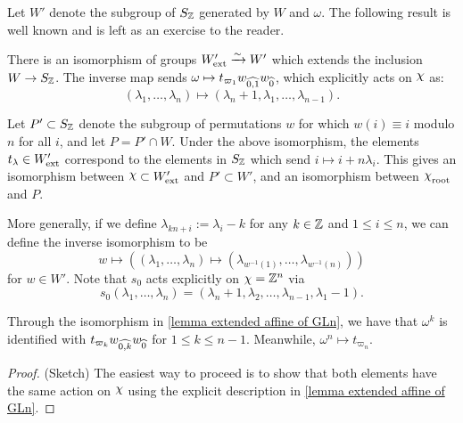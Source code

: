 Let $W'$ denote the subgroup of $S_{\mathbb{Z}}$ generated by $W$ and $\omega$. The following result is well known and is left as an exercise to the reader.

\begin{lemma}\label{lemma extended affine of GLn}
There is an isomorphism of groups $W'_{\operatorname{ext}} \xrightarrow{\sim} W'$
which extends the inclusion $W \to S_{\mathbb{Z}}$. The inverse map sends $\omega \mapsto t_{\varpi_1}w_{\widehat{0,1}}w_{\widehat{0}}$, which explicitly acts on $\rchi$ as:
$$(\lambda_1, \ldots,\lambda_n)\mapsto (\lambda_n +1, \lambda_1, \ldots, \lambda_{n-1}).$$

Let $P' \subset S_{\mathbb{Z}}$ denote the subgroup of permutations $w$ for which $w(i) \equiv i$ modulo $n$ for all $i$, and let $P = P' \cap W$. Under the above isomorphism, the elements $t_\lambda \in W_{\operatorname{ext}}'$ correspond to the elements in $S_{\mathbb{Z}}$ which send $i \mapsto i + n\lambda_i$. This gives an isomorphism between $\rchi \subset W_{\ext}'$ and $P' \subset W'$, and an isomorphism between $\rchi_{\rt}$ and $P$.
\end{lemma}

\begin{remark} More generally, if we define $\lambda_{kn+i}:=\lambda_i-k$ for any $k \in \mathbb{Z}$ and $1\leq i \leq n$, we can define the inverse isomorphism to be 
$$w \mapsto \left((\lambda_1,\ldots,\lambda_n) \mapsto(\lambda_{w^{-1}(1)}, \ldots, \lambda_{w^{-1}(n)})\right)$$
for $w \in W'$. Note that $s_0$ acts explicitly on $\chi=\mathbb{Z}^n$ via
$$s_0(\lambda_1, \ldots, \lambda_n)=(\lambda_n +1, \lambda_2, \ldots, \lambda_{n-1}, \lambda_{1}-1).$$ \end{remark}

\begin{corollary}\label{formula for omega-k}
 Through the isomorphism in \cref{lemma extended affine of GLn}, we have that
$\omega^k$ is identified with $t_{\varpi_k}w_{\widehat{0,k}}w_{\widehat{0}}$ for $1\leq k \leq n-1$. Meanwhile, $\omega^n \mapsto t_{\varpi_n}$.
 \end{corollary}
\begin{proof} (Sketch) The easiest way to proceed is to show that both elements have the same action on $\rchi$ using the explicit description in \cref{lemma extended affine of GLn}.
\end{proof}

 
